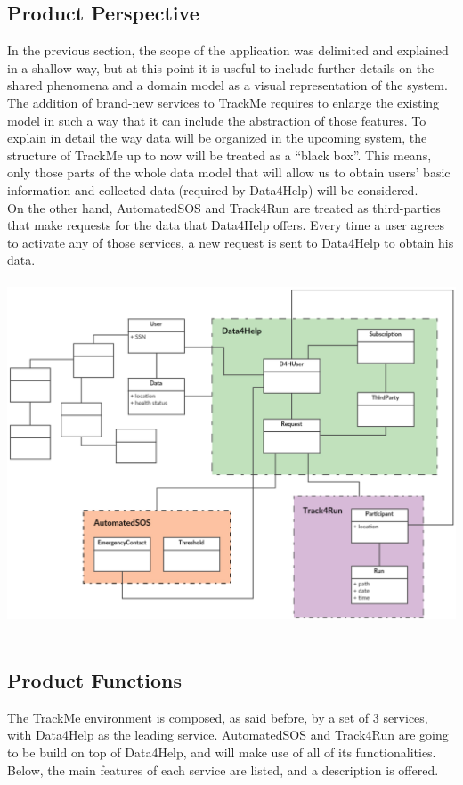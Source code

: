 \documentclass[12pt]{article}
\begin{document}
\subsection{Product Perspective}
In the previous section, the scope of the application was delimited and explained in a shallow way, but at this point it is useful to include further details on the shared phenomena and a domain model as a visual representation of the system.  \\
 The addition of brand-new services to TrackMe requires to enlarge the existing model in such a way that it can include the abstraction of those features. To explain in detail the way data will be organized in the upcoming system, the structure of TrackMe up to now will be treated as a “black box”. This means, only those parts of the whole data model that will allow us to obtain users’ basic information and collected data (required by Data4Help) will be considered. \\
 On the other hand, AutomatedSOS and Track4Run are treated as third-parties that make requests for the data that Data4Help offers. Every time a user agrees to activate any of those services, a new request is sent to Data4Help to obtain his data. \\\\
 \includegraphics[scale=0.5]{Diagrams/Domain_model.png}\\
\\
\subsection{Product Functions}
The TrackMe environment is composed, as said before, by a set of 3 services, with Data4Help as the leading service. AutomatedSOS and Track4Run are going to be build on top of Data4Help, and will make use of all of its functionalities. Below, the main features of each service are listed, and a description is offered.
\end{document}
